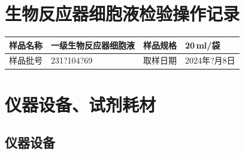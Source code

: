 \documentclass[UTF8,10pt,a4paper,fontset=fandol]{ctexart}
\newcommand{\fieldvalue}[1]{#1}
\newcommand{\handwritten}[1]{#1}
\begin{document}
\newpage

\section*{生物反应器细胞液检验操作记录}

\begin{tabularx}{\textwidth}{|p{3cm}|X|p{3cm}|X|}
\hline
样品名称 &
\fieldvalue{\handwritten{一级生物反应器细胞液}} &
样品规格 &
\fieldvalue{\handwritten{20}\,ml/袋}
\\ \hline
样品批号 &
\fieldvalue{\handwritten{231?104?69}} &
取样日期 &
\fieldvalue{\handwritten{2024年?月8日}}
\\ \hline
\end{tabularx}

\section{仪器设备、试剂耗材}

\subsection{仪器设备}
\end{document}
